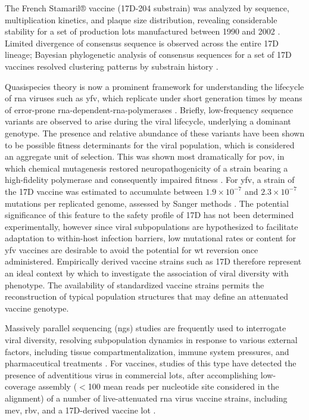 The French Stamaril® vaccine (17D-204 substrain) was analyzed by sequence, multiplication kinetics, and plaque size distribution, revealing considerable stability for a set of production lots manufactured between 1990 and 2002 \parencite{Barban:2007hi}. Limited divergence of consensus sequence is observed across the entire 17D lineage; Bayesian phylogenetic analysis of consensus sequences for a set of 17D vaccines resolved clustering patterns by substrain history \parencite{Stock:2012gp}.

Quasispecies theory is now a prominent framework for understanding the lifecycle of \gls{rna} viruses such as \gls{yfv}, which replicate under short generation times by means of error-prone \gls{rna}-dependent-\gls{rna}-polymerases \parencite{Domingo:2012hw}. Briefly, low-frequency sequence variants are observed to arise during the viral lifecycle, underlying a dominant genotype. The presence and relative abundance of these variants have been shown to be possible fitness determinants for the viral population, which is considered an aggregate unit of selection. This was shown most dramatically for \gls{pov}, in which chemical mutagenesis restored neuropathogenicity of a strain bearing a high-fidelity polymerase and consequently impaired fitness \parencite{Vignuzzi:2006ju}. For \gls{yfv}, a strain of the 17D vaccine was estimated to accumulate between $1.9 \times 10^{-7}$ and $2.3 \times 10^{-7}$ mutations per replicated genome, assessed by Sanger methods \parencite{Pugachev:2003fj}. The potential significance of this feature to the safety profile of 17D has not been determined experimentally, however since viral subpopulations are hypothesized to facilitate adaptation to within-host infection barriers, low mutational rates or content for \gls{yfv} vaccines are desirable to avoid the potential for \gls{wt} reversion once administered. Empirically derived vaccine strains such as 17D therefore represent an ideal context by which to investigate the association of viral diversity with phenotype. The availability of standardized vaccine strains permits the reconstruction of typical population structures that may define an attenuated vaccine genotype.

Massively parallel sequencing (\gls{ngs}) studies are frequently used to interrogate viral diversity, resolving subpopulation dynamics in response to various external factors, including tissue compartmentalization, immune system pressures, and pharmaceutical treatments \parencite{Nishijima:2012ew}. For vaccines, studies of this type have detected the presence of adventitious virus in commercial lots, after accomplishing low-coverage assembly ($<$100 mean reads per nucleotide site considered in the alignment) of a number of live-attenuated \gls{rna} virus vaccine strains, including \gls{mev}, \gls{rbv}, and a 17D-derived vaccine lot \parencite{Victoria:2010kf}. 

